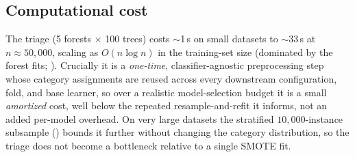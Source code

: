 \subsection{Computational cost}\label{sec:results:cost}

The triage (5 forests $\times$ 100 trees) costs $\sim$1\,s on small datasets to
$\sim$33\,s at $n\approx50{,}000$, scaling as $O(n\log n)$ in the training-set size
(dominated by the forest fits; ). Crucially it is a \emph{one-time},
classifier-agnostic preprocessing step whose category assignments are reused across
every downstream configuration, fold, and base learner, so over a realistic
model-selection budget it is a small \emph{amortized} cost, well below the
repeated resample-and-refit it informs, not an added per-model overhead. On very
large datasets the stratified $10{,}000$-instance subsample
() bounds it further without changing the category
distribution, so the triage does not become a bottleneck relative to a single SMOTE
fit.
